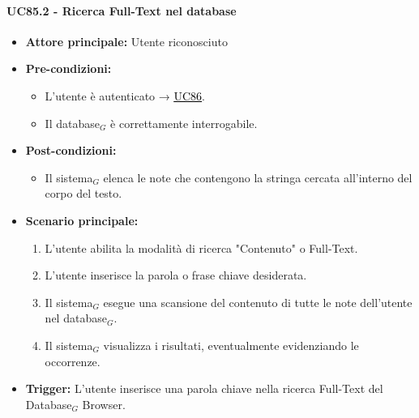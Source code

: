 \documentclass[a4paper, 10pt]{article}
\newcommand{\uclink}[2]{\hyperlink{#1}{\textcolor{black}{\underline{#2}}}}
\begin{document}
\paragraph{UC85.2 - Ricerca Full-Text nel database}
\hypertarget{uc:85.2}{}
\begin{itemize}
    \item \textbf{Attore principale:} Utente riconosciuto
    \item \textbf{Pre-condizioni:} 
        \begin{itemize}
            \item L'utente è autenticato → \uclink{uc:86}{UC86}.
            \item Il database$_G$ è correttamente interrogabile.
        \end{itemize}
    \item \textbf{Post-condizioni:} 
        \begin{itemize}
            \item Il sistema$_G$ elenca le note che contengono la stringa cercata all'interno del corpo del testo.
        \end{itemize}
    \item \textbf{Scenario principale:}
        \begin{enumerate}
            \item L'utente abilita la modalità di ricerca "Contenuto" o Full-Text.
            \item L'utente inserisce la parola o frase chiave desiderata.
            \item Il sistema$_G$ esegue una scansione del contenuto di tutte le note dell'utente nel database$_G$.
            \item Il sistema$_G$ visualizza i risultati, eventualmente evidenziando le occorrenze.
        \end{enumerate}
    \item \textbf{Trigger:} L'utente inserisce una parola chiave nella ricerca Full-Text del Database$_G$ Browser.
\end{itemize}
\end{document}
